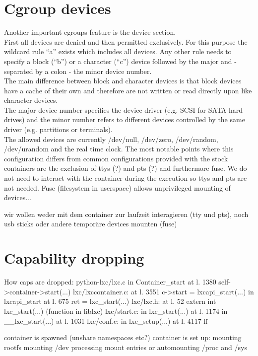 \section{Cgroup devices}

Another important cgroups feature is the device section.\\
First all devices are denied and then permitted exclusively. For this purpose the wildcard rule ``a'' exists which includes
all devices. Any other rule needs to specify a block (``b'') or a character (``c'') device followed by the major and
- separated by a colon - the minor device number.\\
The main difference between block and character devices is that block devices have a cache of their own and therefore are not
written or read directly upon like character devices.\\
The major device number specifies the device driver (e.g. SCSI for SATA hard drives) and the minor number refers to different
devices controlled by the same driver (e.g. partitions or terminals)\cite{devicenumbers}.\\
The allowed devices are currently /dev/null, /dev/zero, /dev/random, /dev/urandom and the real time clock.
The most notable points where this configuration differs from common configurations provided with the stock containers are
the exclusion of ttys (?) and pts (?) and furthermore fuse.
We do not need to interact with the container during the execution so ttys and pts are not needed.
Fuse (filesystem in userspace) allows unprivileged mounting of devices...

wir wollen weder mit dem container zur laufzeit interagieren (tty und pts), noch usb sticks oder andere temporäre devices mounten (fuse)


\section{Capability dropping}

How caps are dropped:
python-lxc/lxc.c in Container\_start at l. 1380 self->container->start(...)
lxc/lxccontainer.c: at l. 3551 c->start = lxcapi\_start(...)
		    in lxcapi\_start at l. 675 ret = lxc\_start(...)
lxc/lxc.h: at l. 52 extern int lxc\_start(...) (function in liblxc)
lxc/start.c: in lxc\_start(...) at l. 1174
	     in \_\_lxc\_start(...) at l. 1031
lxc/conf.c: in lxc\_setup(...) at l. 4117 ff

container is spawned
  (unshare namespaces etc?)
container is set up:
  mounting rootfs
  mounting /dev
  processing mount entries or automounting /proc and /sys

